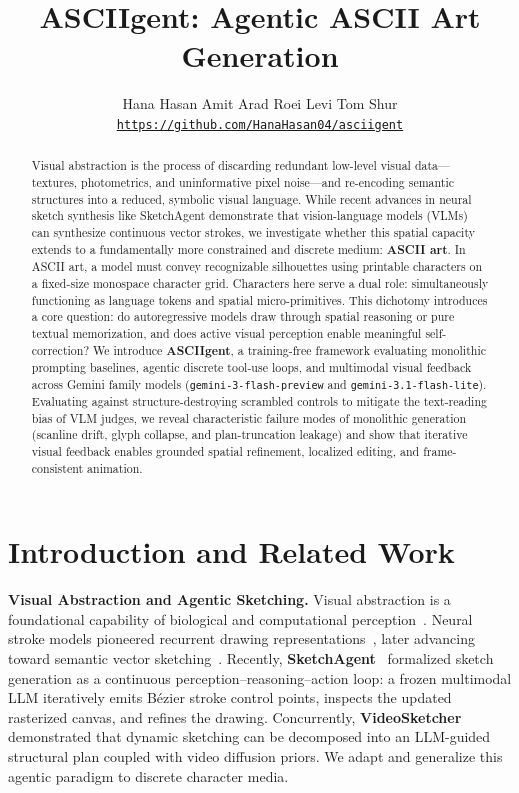 \documentclass[10pt,twocolumn]{article}
\title{\vspace{-1.5em}\Large\textbf{ASCIIgent: Agentic ASCII Art Generation}\vspace{-0.4em}}
\author{
  \normalsize Hana Hasan \qquad Amit Arad \qquad Roei Levi \qquad Tom Shur \\[0.2em]
  \small\href{https://github.com/HanaHasan04/asciigent}{\texttt{https://github.com/HanaHasan04/asciigent}}
}
\date{\vspace{-1.6em}}
\begin{document}
\maketitle

\begin{abstract}
\noindent
Visual abstraction is the process of discarding redundant low-level visual data---textures, photometrics, and uninformative pixel noise---and re-encoding semantic structures into a reduced, symbolic visual language. While recent advances in neural sketch synthesis like SketchAgent demonstrate that vision-language models (VLMs) can synthesize continuous vector strokes, we investigate whether this spatial capacity extends to a fundamentally more constrained and discrete medium: \textbf{ASCII art}. In ASCII art, a model must convey recognizable silhouettes using printable characters on a fixed-size monospace character grid. Characters here serve a dual role: simultaneously functioning as language tokens and spatial micro-primitives. This dichotomy introduces a core question: do autoregressive models draw through spatial reasoning or pure textual memorization, and does active visual perception enable meaningful self-correction? We introduce \textbf{ASCIIgent}, a training-free framework evaluating monolithic prompting baselines, agentic discrete tool-use loops, and multimodal visual feedback across Gemini family models (\texttt{gemini-3-flash-preview} and \texttt{gemini-3.1-flash-lite}). Evaluating against structure-destroying scrambled controls to mitigate the text-reading bias of VLM judges, we reveal characteristic failure modes of monolithic generation (scanline drift, glyph collapse, and plan-truncation leakage) and show that iterative visual feedback enables grounded spatial refinement, localized editing, and frame-consistent animation.
\end{abstract}

\section{Introduction and Related Work}

\textbf{Visual Abstraction and Agentic Sketching.}
Visual abstraction is a foundational capability of biological and computational perception~\cite{hertzmann2020line}. Neural stroke models pioneered recurrent drawing representations~\cite{ha2017neural}, later advancing toward semantic vector sketching~\cite{vinker2022clipasso}. Recently, \textbf{SketchAgent}~\cite{vinker2025sketchagent} formalized sketch generation as a continuous perception--reasoning--action loop: a frozen multimodal LLM iteratively emits B\'{e}zier stroke control points, inspects the updated rasterized canvas, and refines the drawing. Concurrently, \textbf{VideoSketcher}~\cite{ren2025videosketcher} demonstrated that dynamic sketching can be decomposed into an LLM-guided structural plan coupled with video diffusion priors. We adapt and generalize this agentic paradigm to discrete character media.
\end{document}
